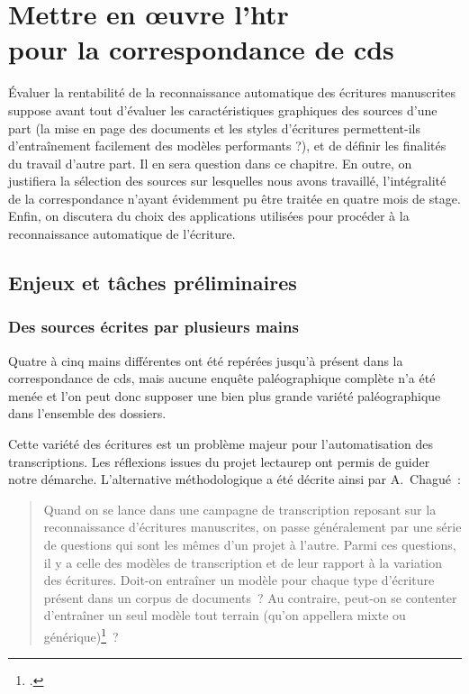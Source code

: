 \documentclass[a4paper,12pt,twoside]{book}
\begin{document}
	\chapter[HTR~: mise en œuvre]{Mettre en œuvre l'\gls{htr} \\ \large pour la correspondance de \gls{cds}}
		
		Évaluer la rentabilité de la reconnaissance automatique des écritures manuscrites suppose avant tout d'évaluer les caractéristiques graphiques des sources d'une part (la mise en page des documents et les styles d'écritures permettent-ils d'entraînement facilement des modèles performants ?), et de définir les finalités du travail d'autre part. Il en sera question dans ce chapitre. En outre, on justifiera la sélection des sources sur lesquelles nous avons travaillé, l'intégralité de la correspondance n'ayant évidemment pu être traitée en quatre mois de stage. Enfin, on discutera du choix des applications utilisées pour procéder à la reconnaissance automatique de l'écriture.
	
		
		\section{Enjeux et tâches préliminaires}
			
			\subsection{Des sources écrites par plusieurs mains}
				Quatre à cinq mains différentes ont été repérées jusqu'à présent dans la correspondance de \gls{cds}, mais aucune enquête paléographique complète n'a été menée et l'on peut donc supposer une bien plus grande variété paléographique dans l'ensemble des dossiers.
				
				Cette variété des écritures est un problème majeur pour l'automatisation des transcriptions. Les réflexions issues du projet \gls{lectaurep} ont permis de guider notre démarche. L'alternative méthodologique a été décrite ainsi par A.~Chagué~:
				
				\begin{quotation}
					Quand on se lance dans une campagne de transcription reposant sur la reconnaissance d’écritures manuscrites, on passe généralement par une série de questions qui sont les mêmes d’un projet à l’autre. Parmi ces questions, il y a celle des modèles de transcription et de leur rapport à la variation des écritures. Doit-on entraîner un modèle pour chaque type d’écriture présent dans un corpus de documents~? Au contraire, peut-on se contenter d’entraîner un seul modèle tout terrain (qu’on appellera mixte ou générique)\footcite{chagueCreationModelesTranscription}~?
				\end{quotation}
			
\end{document}
